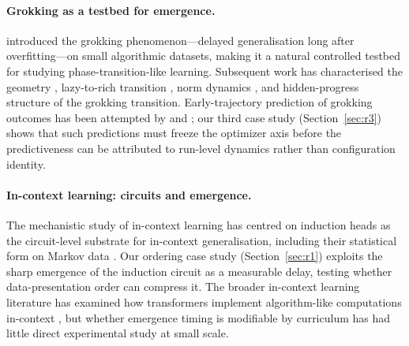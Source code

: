 \documentclass[11pt]{article}
\theoremstyle{plain}
\theoremstyle{definition}
\begin{document}
\paragraph{Grokking as a testbed for emergence.}
\citet{power2022grokking} introduced the grokking phenomenon---delayed generalisation
long after overfitting---on small algorithmic datasets, making it a natural controlled
testbed for studying phase-transition-like learning.
Subsequent work has characterised the geometry \citep{liu2023omnigrok}, lazy-to-rich
transition \citep{kumar2024lazytorich}, norm
dynamics \citep{prieto2025stablemax}, and hidden-progress structure
\citep{nanda2023progress,barak2022hidden} of the grokking transition.
Early-trajectory prediction of grokking outcomes has been attempted by
\citet{notsawo2023predicting} and \citet{xu2026earlywarning}; our third case study
(Section~\ref{sec:r3}) shows that such predictions must freeze the optimizer axis before
the predictiveness can be attributed to run-level dynamics rather than configuration
identity.

\paragraph{In-context learning: circuits and emergence.}
The mechanistic study of in-context learning has centred on induction heads
\citep{olsson2022induction} as the circuit-level substrate for in-context
generalisation, including their statistical form on Markov data
\citep{edelman2024statinduction}.
Our ordering case study (Section~\ref{sec:r1}) exploits the sharp emergence of the
induction circuit as a measurable delay, testing whether data-presentation order can
compress it.
The broader in-context learning literature has examined how transformers implement
algorithm-like computations in-context \citep{akyurek2024iclalgorithms,garg2022icl,vonoswald2023gd}, but whether emergence timing is modifiable by curriculum has had little
direct experimental study at small scale.
\end{document}
